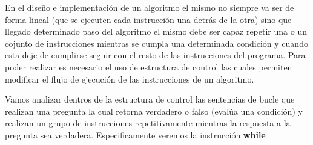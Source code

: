 En el diseño e implementación de un algoritmo el mismo no siempre va ser de forma lineal (que se ejecuten cada instrucción una detrás de la otra) sino que llegado determinado paso del algoritmo el mismo debe ser capaz repetir una o un cojunto de instrucciones mientras se cumpla una determinada condición y cuando esta deje de cumplirse seguir con el resto de las instrucciones del programa. Para poder realizar es necesario el uso de estructura de control las cuales permiten modificar el flujo de ejecución de las instrucciones de un algoritmo.

Vamos analizar dentros de la estructura de control las sentencias de bucle que
realizan una pregunta la cual retorna verdadero o falso (evalúa una condición) y realizan un grupo de instrucciones repetitivamente mientras la respuesta a la pregunta sea verdadera. Especificamente veremos la instrucción \textbf{while}
